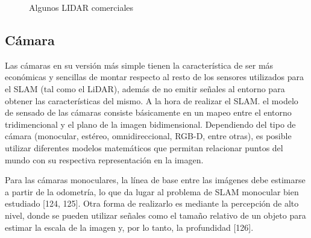 \begin{figure}
    \centering
    \qquad
    \caption{Algunos LIDAR comerciales}
    \label{fig:lidars}
\end{figure}

\subsection{Cámara}
Las cámaras en su versión más simple tienen la característica de ser más económicas y sencillas de montar respecto al resto de los sensores utilizados para el SLAM (tal como el LiDAR), además de no emitir señales al entorno para obtener las características del mismo. A la hora de realizar el SLAM. el modelo de sensado de las cámaras consiste básicamente en un mapeo entre el entorno tridimencional y el plano de la imagen bidimensional. Dependiendo del tipo de cámara (monocular, estéreo, omnidireccional, RGB-D, entre otras), es posible utilizar diferentes modelos matemáticos que permitan relacionar puntos del mundo con su respectiva representación en la imagen.

Para las cámaras monoculares, la línea de base entre las imágenes debe estimarse a partir de la odometría, lo que da lugar al problema de SLAM monocular bien estudiado [124, 125]. Otra forma de realizarlo es mediante la percepción de alto nivel, donde se pueden utilizar señales como el tamaño relativo de un objeto para estimar la escala de la imagen y, por lo tanto, la profundidad [126].


